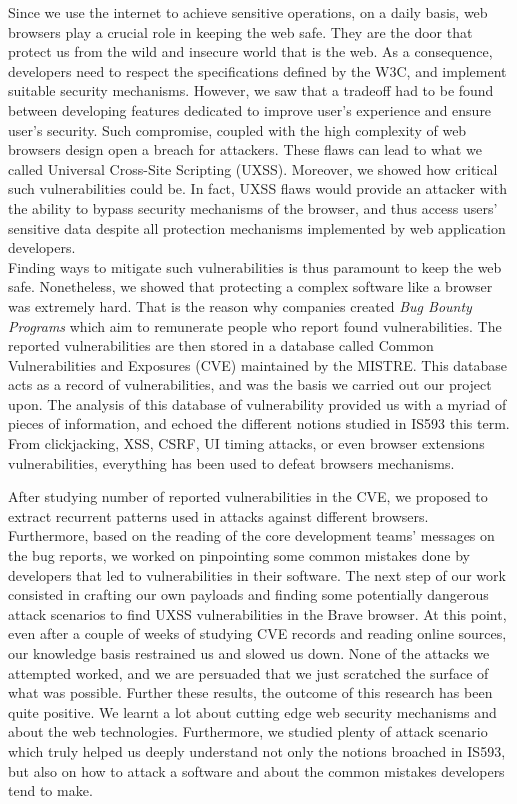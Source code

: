 \documentclass[journal]{IEEEtran}
\begin{document}
Since we use the internet to achieve sensitive operations, on a daily basis, web browsers play a crucial role in keeping the web safe. They are the door that protect us from the wild and insecure world that is the web. As a consequence, developers need to respect the specifications defined by the W3C, and implement suitable security mechanisms. However, we saw that a tradeoff had to be found between developing features dedicated to improve user's experience and ensure user's security. Such compromise, coupled with the high complexity of web browsers design open a breach for attackers. These flaws can lead to what we called Universal Cross-Site Scripting (UXSS). Moreover, we showed how critical such vulnerabilities could be. In fact, UXSS flaws would provide an attacker with the ability to bypass security mechanisms of the browser, and thus access users' sensitive data despite all protection mechanisms implemented by web application developers. \\
Finding ways to mitigate such vulnerabilities is thus paramount to keep the web safe. Nonetheless, we showed that protecting a complex software like a browser was extremely hard. That is the reason why companies created \emph{Bug Bounty Programs} which aim to remunerate people who report found vulnerabilities. The reported vulnerabilities are then stored in a database called Common Vulnerabilities and Exposures (CVE) maintained by the MISTRE. This database acts as a record of vulnerabilities, and was the basis we carried out our project upon. The analysis of this database of vulnerability provided us with a myriad of pieces of information, and echoed the different notions studied in IS593 this term. From clickjacking, XSS, CSRF, UI timing attacks, or even browser extensions vulnerabilities, everything has been used to defeat browsers mechanisms. 

\medskip

After studying number of reported vulnerabilities in the CVE, we proposed to extract recurrent patterns used in attacks against different browsers. Furthermore, based on the reading of the core development teams' messages on the bug reports, we worked on pinpointing some common mistakes done by developers that led to vulnerabilities in their software. The next step of our work consisted in crafting our own payloads and finding some potentially dangerous attack scenarios to find UXSS vulnerabilities in the Brave browser. At this point, even after a couple of weeks of studying CVE records and reading online sources, our knowledge basis restrained us and slowed us down. None of the attacks we attempted worked, and we are persuaded that we just scratched the surface of what was possible. Further these results, the outcome of this research has been quite positive. We learnt a lot about cutting edge web security mechanisms and about the web technologies. Furthermore, we studied plenty of attack scenario which truly helped us deeply understand not only the notions broached in IS593, but also on how to attack a software and about the common mistakes developers tend to make.
\end{document}

